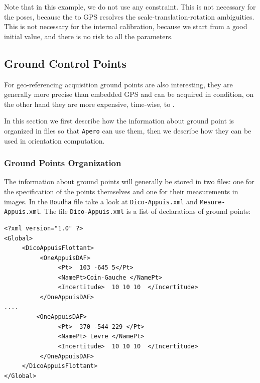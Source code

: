 Note that in this example, we do not use any constraint. This is not necessary for the poses,
because the 
 to GPS resolves the scale-translation-rotation ambiguities.
This is not necessary for the internal calibration, because we start from a good initial
value, and there is no risk to  %
 all the parameters.



\subsection{Ground Control Points}

For geo-referencing acquisition ground points are also interesting,
they are generally more precise than embedded GPS and can be acquired in
 condition, on the other hand they are more expensive, time-wise, to
.

In this section we first describe how the information about ground point
is organized in files so that {\tt Apero} can use them, then we describe
how they can be used in orientation computation.


\subsubsection{Ground Points Organization}

\label{GCP:Org}

The information about ground points will generally be stored in two files:
one for the specification of the points themselves and one for their measurements
in images. In the {\tt Boudha} file take a look at {\tt Dico-Appuis.xml}
and {\tt Mesure-Appuis.xml}. The file {\tt Dico-Appuis.xml} is a list
of declarations of ground points:

{\scriptsize
\begin{verbatim}
<?xml version="1.0" ?>
<Global>
     <DicoAppuisFlottant>
          <OneAppuisDAF>
               <Pt>  103 -645 5</Pt>
               <NamePt>Coin-Gauche </NamePt>
               <Incertitude>  10 10 10  </Incertitude>
          </OneAppuisDAF>
....
         <OneAppuisDAF>
               <Pt>  370 -544 229 </Pt>
               <NamePt> Levre </NamePt>
               <Incertitude>  10 10 10  </Incertitude>
          </OneAppuisDAF>
     </DicoAppuisFlottant>
</Global>
\end{verbatim}
}

